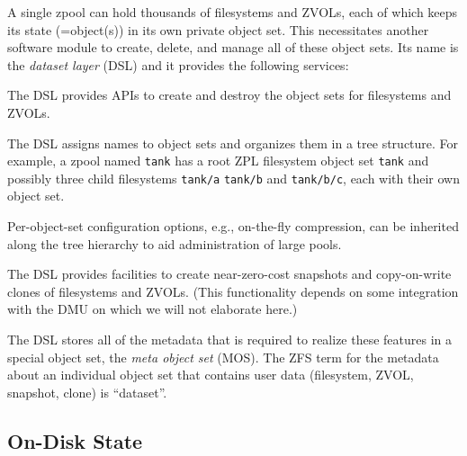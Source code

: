 \documentclass[12pt,a4paper,twoside]{book}
\begin{document}
A single zpool can hold thousands of filesystems and ZVOLs, each of which keeps its state (=object(s)) in its own private object set.
This necessitates another software module to create, delete, and manage all of these object sets.
Its name is the \textit{dataset layer} (DSL) and it provides the following services:
\begin{description}[noitemsep,leftmargin=1.5cm,labelindent=1cm]
    \item[Creation \& Destruction Of Object Sets] The DSL provides APIs to create and destroy the object sets for filesystems and ZVOLs.
    \item[Naming \& Hierarchical Organization Of Object Sets] The DSL assigns names to object sets and organizes them in a tree structure.
        For example, a zpool named \lstinline{tank} has a root ZPL filesystem object set \lstinline{tank} and possibly three child filesystems \lstinline{tank/a} \lstinline{tank/b} and \lstinline{tank/b/c}, each with their own object set.
    \item[Properties \& Inheritance] Per-object-set configuration options, e.g., on-the-fly compression, can be inherited along the tree hierarchy to aid administration of large pools.
    \item[Snapshots \& Clones] The DSL provides facilities to create near-zero-cost snapshots and copy-on-write clones of filesystems and ZVOLs.
        (This functionality depends on some integration with the DMU on which we will not elaborate here.)
\end{description}
The DSL stores all of the metadata that is required to realize these features in a special object set, the \textit{meta object set} (MOS).
The ZFS term for the metadata about an individual object set that contains user data (filesystem, ZVOL, snapshot, clone) is ``dataset''.

\subsection{On-Disk State}\label{sec:openzfs_background:ondiskstate}
\end{document}
